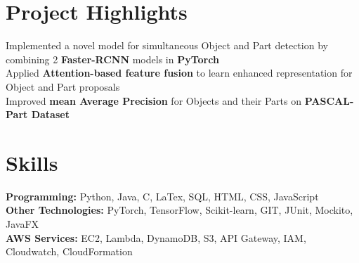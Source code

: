 \documentclass[]{Keval-resume}
\begin{document}
\section{Project Highlights}
\hrulefill
\postsectionsep




\textbullet{} Implemented a novel model for simultaneous Object and Part detection by combining 2 \textbf{Faster-RCNN} models in \textbf{PyTorch} \\
\textbullet{} Applied \textbf{Attention-based feature fusion} to learn enhanced representation for Object and Part proposals \\
\textbullet{} Improved \textbf{mean Average Precision} for Objects and their Parts on \textbf{PASCAL-Part Dataset}
\sectionsep

\section{Skills} 
\hrulefill
\postsectionsep

\textbullet{} \textbf{Programming:} Python, Java, C, LaTex, SQL, HTML, CSS, JavaScript \\
\textbullet{} \textbf{Other Technologies:} PyTorch, TensorFlow, Scikit-learn, GIT, JUnit, Mockito, JavaFX \\
\textbullet{} \textbf{AWS Services:} EC2, Lambda, DynamoDB, S3, API Gateway, IAM, Cloudwatch, CloudFormation
\end{document}
